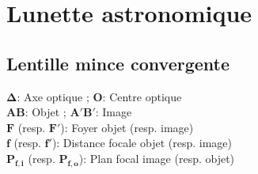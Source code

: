 \documentclass[a5paper,10pt]{article}
\begin{document}
\section{Lunette astronomique}
\begin{minipage}[t]{0.55\linewidth}
    \vspace*{0pt}
    \subsection{Lentille mince convergente}
    $\bm{\Delta}$: Axe optique ; \quad $\bm{O}$: Centre optique\\
    $\bm{AB}$: Objet ; \quad $\bm{A'B'}$: Image\\
    $\bm{F}$ (resp. $\bm{F'}$): Foyer objet (resp. image)\\
    $\bm{f}$ (resp. $\bm{f'}$): Distance focale objet (resp. image)\\
    $\bm{P_{f,i}}$ (resp. $\bm{P_{f,o}}$): Plan focal image (resp. objet)
\end{minipage}
\begin{minipage}[t]{0.05\linewidth}
    \phantom{a}
\end{minipage}
\end{document}
